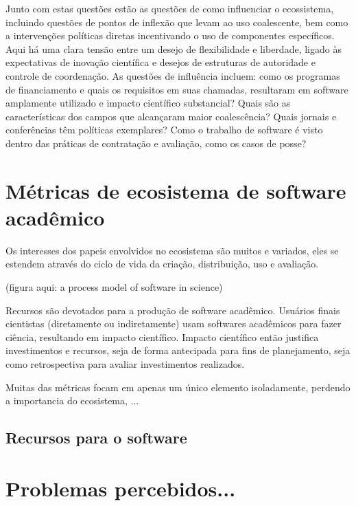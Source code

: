 Junto com estas questões estão as questões de como influenciar o ecossistema,
incluindo questões de pontos de inflexão que levam ao uso coalescente, bem como
a intervenções políticas diretas incentivando o uso de componentes específicos.
Aqui há uma clara tensão entre um desejo de flexibilidade e liberdade, ligado
às expectativas de inovação científica e desejos de estruturas de autoridade e
controle de coordenação. As questões de influência incluem: como os programas
de financiamento e quais os requisitos em suas chamadas, resultaram em software
amplamente utilizado e impacto científico substancial? Quais são as
características dos campos que alcançaram maior coalescência? Quais jornais e
conferências têm políticas exemplares? Como o trabalho de software é visto
dentro das práticas de contratação e avaliação, como os casos de posse?

\cite{howison2015understanding}

\section{Métricas de ecosistema de software acadêmico}

Os interesses dos papeis envolvidos no ecosistema são muitos e variados,
eles se estendem através do ciclo de vida da criação, distribuição, uso e avaliação.

(figura aqui: a process model of software in science)

Recursos são devotados para a produção de software acadêmico. Usuários finais
cientistas (diretamente ou indiretamente) usam softwares acadêmicos para fazer
ciência, resultando em impacto científico. Impacto científico então justifica
investimentos e recursos, seja de forma antecipada para fins de planejamento,
seja como retrospectiva para avaliar investimentos realizados.

Muitas das métricas focam em apenas um único elemento isoladamente, perdendo
a importancia do ecosistema, ...

\subsection{Recursos para o software}




\section{Problemas percebidos...}

